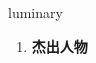 
\begin{frame}
{\huge luminary}
\begin{center}
\begin{enumerate}\Large
  \item \textbf{杰出人物}
\end{enumerate}
\end{center}
\end{frame}
